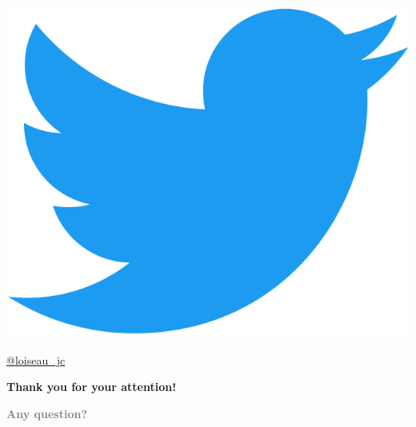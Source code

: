 \documentclass[aspectratio=169, usenames, dvipsnames]{beamer}
\begin{document}
{\begin{frame}
    \bigskip

    \begin{minipage}{.28\textwidth}
      \centering
      \includegraphics[height=.15\textheight]{twitter}
    \end{minipage}%
    \hfill
    \begin{minipage}{.68\textwidth}
      \url{@loiseau_jc}
    \end{minipage}

  \end{frame}
}

\begin{frame}
  \vfill
  \flushright

  {
  \Large
  \textbf{Thank you for your attention!}
  }

  \bigskip

  {
  \large
  \textcolor{gray}{
  \textbf{Any question?}
  }
  }
  \vfill
\end{frame}
\end{document}

